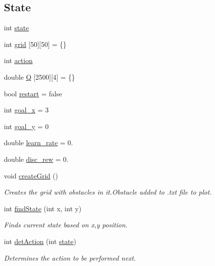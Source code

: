 \subsection*{State}
\begin{DoxyCompactItemize}
\item 
int \hyperlink{classQclass_ac7e42ac35f89616a6036aabd29e928f7}{state}
\item 
int \hyperlink{classQclass_ab060f941f076f76056d8276594893b54}{grid} \mbox{[}50\mbox{]}\mbox{[}50\mbox{]} = \{\}
\item 
int \hyperlink{classQclass_a1a72661a0262d34a0b4326c0ef654a1e}{action}
\item 
double \hyperlink{classQclass_a84fb95339b401c66efa8c47d1426c1fe}{Q} \mbox{[}2500\mbox{]}\mbox{[}4\mbox{]} = \{\}
\item 
bool \hyperlink{classQclass_a04ec3a45dc94d48bf13e27c3f18b8399}{restart} = false
\item 
int \hyperlink{classQclass_ab8b70c6206387fcf4dd9ff6d4d7cb2a6}{goal\+\_\+x} = 3
\item 
int \hyperlink{classQclass_a492324bfb266e2ed4f0faf4487fad979}{goal\+\_\+y} = 0
\item 
double \hyperlink{classQclass_addcd4274dbe26c15264572bf354cbd79}{learn\+\_\+rate} = 0.
\item 
double \hyperlink{classQclass_aca70cf943c9d29dcea36f7c6a46d9f0e}{disc\+\_\+rew} = 0.
\item 
void \hyperlink{classQclass_ae9f97c2f18fc7d9e307e35994901da2a}{create\+Grid} ()
\begin{DoxyCompactList}\small\item\em Creates the grid with obstacles in it.\+Obstacle added to .txt file to plot. \end{DoxyCompactList}\item 
int \hyperlink{classQclass_a834429fa9e01f1b283a0caada7802be3}{find\+State} (int x, int y)
\begin{DoxyCompactList}\small\item\em Finds current state based on x,y position. \end{DoxyCompactList}\item 
int \hyperlink{classQclass_a9037e62a852d506051538adfcf7e2337}{det\+Action} (int \hyperlink{classQclass_ac7e42ac35f89616a6036aabd29e928f7}{state})
\begin{DoxyCompactList}\small\item\em Determines the action to be performed next. \end{DoxyCompactList}\item 

\end{DoxyCompactItemize}
